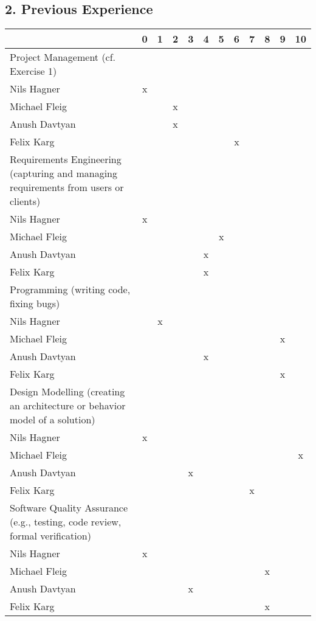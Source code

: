 \documentclass{scrartcl}
\begin{document}
\subsection*{2. Previous Experience}


\begin{tabular}{| p{10cm} | c | c | c | c | c | c | c | c | c | c | c |}
	\hline
	& 0& 1& 2& 3& 4& 5& 6& 7& 8& 9& 10\\
	\hline
	Project Management (cf. Exercise 1) \\
	\hline
	Nils Hagner &x&&&&&&&&&&\\ \hline
	Michael Fleig &&&x&&&&&&&&\\ \hline
	Anush Davtyan &&&x&&&&&&&&\\ \hline
	Felix Karg &&&&&&&x&&&&\\ \hline
	Requirements Engineering (capturing and managing requirements from users or clients)\\
	\hline
	Nils Hagner &x&&&&&&&&&&\\ \hline
	Michael Fleig &&&&&&x&&&&&\\ \hline
	Anush Davtyan &&&&&x&&&&&&\\ \hline
	Felix Karg &&&&&x&&&&&&\\ \hline
	Programming (writing code, fixing bugs)\\
	\hline
	Nils Hagner &&x&&&&&&&&&\\ \hline
	Michael Fleig &&&&&&&&&&x&\\ \hline
	Anush Davtyan &&&&&x&&&&&&\\ \hline
	Felix Karg &&&&&&&&&&x&\\ \hline
	Design Modelling (creating an architecture or behavior model of a solution)\\
	\hline
	Nils Hagner &x&&&&&&&&&&\\ \hline
	Michael Fleig &&&&&&&&&&&x\\ \hline
	Anush Davtyan &&&&x&&&&&&&\\ \hline
	Felix Karg &&&&&&&&x&&&\\ \hline
	Software Quality Assurance (e.g., testing, code review, formal verification)\\
	\hline
	Nils Hagner &x&&&&&&&&&&\\ \hline
	Michael Fleig &&&&&&&&&x&&\\ \hline
	Anush Davtyan &&&&x&&&&&&&\\ \hline
	Felix Karg &&&&&&&&&x&&\\ \hline
\end{tabular}
\end{document}
